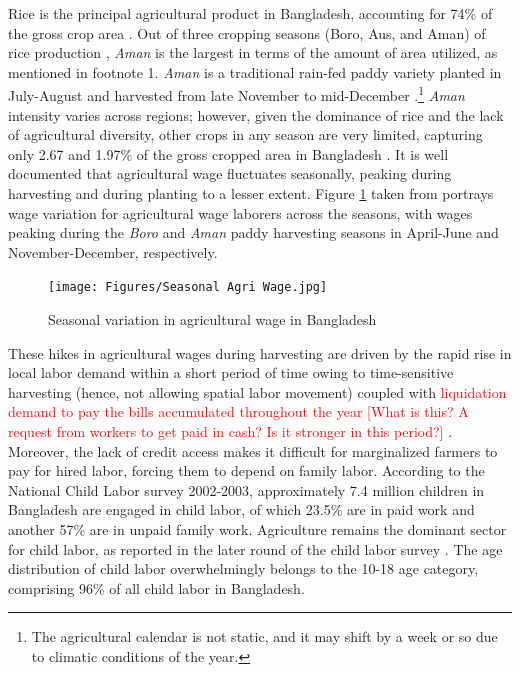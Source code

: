 \documentclass[12pt,letterpaper]{article}\usepackage[margin=1in]{geometry}
\newcommand{\SAdded}[1]{\textcolor{red}{#1}}
\newcommand{\0}{\ensuremath{\mbox{\boldmath $0$}}}
\begin{document}
Rice is the principal agricultural product in Bangladesh, accounting for 74\% of the gross crop area \citep{tisdell2019agricultural}. Out of three cropping seasons (Boro, Aus, and Aman) of rice production \citep{laborte2017riceatlas}, \textit{Aman} is the largest in terms of the amount of area utilized, as mentioned in footnote 1. \textit{Aman} is a traditional rain-fed paddy variety planted in July-August and harvested from late November to mid-December \citep{shelley2016rice}.\footnote{The agricultural calendar is not static, and it may shift by a week or so due to climatic conditions of the year. } \textit{Aman} intensity varies across regions; however, given the dominance of rice and the lack of agricultural diversity, other crops in any season are very limited, capturing only 2.67 and 1.97\% of the gross cropped area in Bangladesh \citep{tisdell2019agricultural}. It is well documented that agricultural wage fluctuates seasonally, peaking during harvesting and during planting to a lesser extent. Figure \ref{wage} taken from \citet{rahman1988labour} portrays wage variation for agricultural wage laborers across the seasons, with wages peaking during the \textit{Boro} and \textit{Aman} paddy harvesting seasons in April-June and November-December, respectively.

\begin{figure}[h!]
\centering
\texttt{[image: Figures/Seasonal Agri Wage.jpg]}\\
\caption{Seasonal variation in agricultural wage in Bangladesh}
\label{wage}
\end{figure}

These hikes in agricultural wages during harvesting are driven by the rapid rise in local labor demand within a short period of time owing to time-sensitive harvesting (hence, not allowing spatial labor movement) coupled with \SAdded{liquidation demand to pay the bills accumulated throughout the year [What is this? A request from workers to get paid in cash? Is it stronger in this period?]} \citep{burke2019sell}. Moreover, the lack of credit access makes it difficult for marginalized farmers to pay for hired labor, forcing them to depend on family labor. According to the \cite{bbs2003report} National Child Labor survey 2002-2003, approximately 7.4 million children in Bangladesh are engaged in child labor, of which 23.5\% are in paid work and another 57\% are in unpaid family work. Agriculture remains the dominant sector for child labor, as reported in the later round of the child labor survey \cite{bbs2013report}. The age distribution of child labor overwhelmingly belongs to the 10-18 age category, comprising 96\% of all child labor in Bangladesh.
\end{document}
